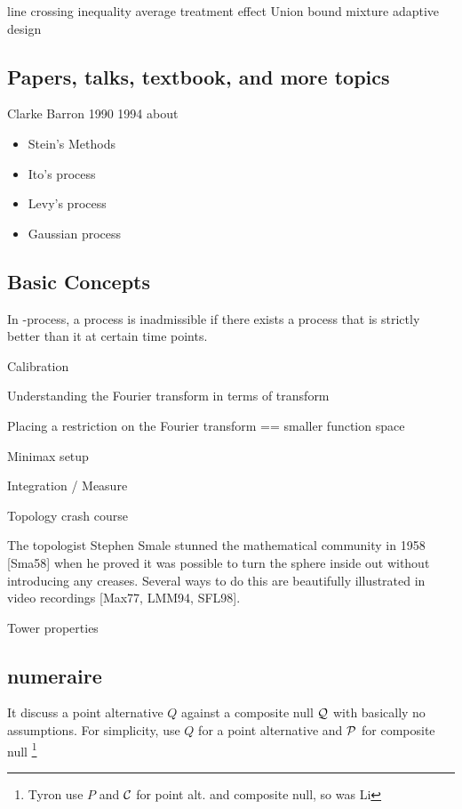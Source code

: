 line crossing inequality
average treatment effect
Union bound
mixture adaptive design

\subsection{Papers, talks, textbook, and more topics}

Clarke Barron 1990 1994 about
\begin{itemize}
	\item Stein's Methods
	\item Ito's process
	\item Levy's process
	\item Gaussian process
\end{itemize}

\subsection{Basic Concepts}

\begin{define}[Admissibility]
	In \E-process, a process is inadmissible
	if there exists a process that is strictly better than it at certain time points.
\end{define}

Calibration


Understanding the Fourier transform in terms of transform

Placing a restriction on the Fourier transform == smaller function space

Minimax setup

Integration / Measure

Topology crash course

The topologist Stephen Smale stunned the mathematical community in
	1958 [Sma58] when he proved it was possible to turn the sphere inside out
without introducing any creases. Several ways to do this are beautifully
illustrated in video recordings [Max77, LMM94, SFL98].

Tower properties


\subsection{numeraire}

It discuss a point alternative $Q$ against a composite null $\mathcal{Q}$ with basically no assumptions.
For simplicity, use $Q$ for a point alternative and $\mathcal{P}$ for composite null 
\footnote{Tyron use $P$ and $\mathcal{C}$ for point alt. and composite null, so was Li}



